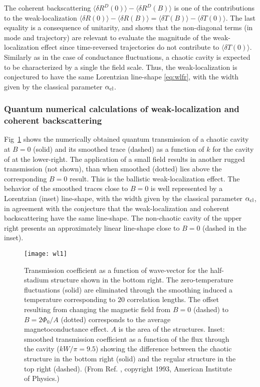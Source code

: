 \documentclass[a4paper,10pt]{article}
\newcommand{\nin}{\noindent}
\newcommand{\alc}{\alpha_{\rm cl}}
\begin{document}
\nin The coherent backscattering 
$\langle \delta R^D(0) \rangle - \langle \delta R^D(B) \rangle$ is one of the contributions to the weak-localization 
$\langle \delta R(0) \rangle - \langle \delta R(B) \rangle =
\langle \delta T(B) \rangle - \langle \delta T(0) \rangle$. The last equality is a consequence of unitarity, and shows that the non-diagonal terms (in mode and trajectory) are relevant to evaluate the magnitude of the weak-localization effect since time-reversed trajectories do not contribute to $\langle \delta T(0) \rangle$. Similarly as in the case of conductance fluctuations, a chaotic cavity is expected to be characterized by a single the field scale. Thus, the weak-localization is conjectured to have the same Lorentzian line-shape \eqref{eq:wlfr}, with
the width given by the classical parameter $\alc$.

\subsubsection{Quantum numerical calculations of weak-localization and coherent backscattering}
\label{subsubsec:qncwlcb}

Fig~\ref{fig:wl1} shows the numerically obtained quantum transmission of a
chaotic cavity at $B=0$ (solid) and its smoothed trace (dashed) as a function of $k$ for the cavity of at the lower-right. The application of a small field results in another rugged transmission (not shown), than when smoothed (dotted) lies above the corresponding $B=0$ result. This is the ballistic weak-localization effect. The behavior of the smoothed traces close to $B=0$ is well represented by a Lorentzian (inset) line-shape, with
the width given by the classical parameter $\alc$, in agreement with the conjecture that the weak-localization and coherent 
backscattering have the same line-shape. The non-chaotic cavity of the upper right presents an approximately linear line-shape close to $B=0$ (dashed in the inset). 

\begin{figure}
\setlength{\unitlength}{1mm}
\centerline{\texttt{[image: wl1]}}
\caption{
Transmission coefficient as a function of wave-vector for the
half-stadium structure shown in the bottom right.
The zero-temperature fluctuations (solid) are eliminated through the
smoothing induced a temperature corresponding to $20$ correlation lengths. The offset resulting from changing the magnetic field from $B=0$ (dashed) to $B= 2 \Phi_{0} /A$ (dotted) corresponds to the average magnetoconductance effect. $A$ is the area of the structures.
Inset: smoothed transmission coefficient as
a function of the flux through the cavity ($kW/\pi = 9.5$) showing the
difference between the chaotic structure in the bottom right (solid) and
the regular structure in the top right (dashed).
(From Ref. {}, copyright 1993, American Institute of Physics.)
}
\label{fig:wl1}
\end{figure}
\end{document}
